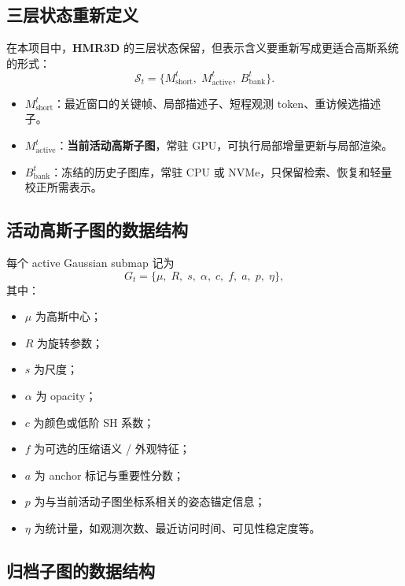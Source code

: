\documentclass[12pt]{article}
\newcommand{\hmr}{\textbf{HMR3D}}
\begin{document}
\subsection{三层状态重新定义}

在本项目中，\hmr{} 的三层状态保留，但表示含义要重新写成更适合高斯系统的形式：
\begin{equation}
\mathcal{S}_t = \{M_{\text{short}}^t,\; M_{\text{active}}^t,\; B_{\text{bank}}^t\}.
\end{equation}

\begin{itemize}
  \item $M_{\text{short}}^t$：最近窗口的关键帧、局部描述子、短程观测 token、重访候选描述子。
  \item $M_{\text{active}}^t$：\textbf{当前活动高斯子图}，常驻 GPU，可执行局部增量更新与局部渲染。
  \item $B_{\text{bank}}^t$：冻结的历史子图库，常驻 CPU 或 NVMe，只保留检索、恢复和轻量校正所需表示。
\end{itemize}

\subsection{活动高斯子图的数据结构}

每个 active Gaussian submap 记为
\begin{equation}
G_t = \{\mu,\; R,\; s,\; \alpha,\; c,\; f,\; a,\; p,\; \eta\},
\end{equation}
其中：
\begin{itemize}
  \item $\mu$ 为高斯中心；
  \item $R$ 为旋转参数；
  \item $s$ 为尺度；
  \item $\alpha$ 为 opacity；
  \item $c$ 为颜色或低阶 SH 系数；
  \item $f$ 为可选的压缩语义 / 外观特征；
  \item $a$ 为 anchor 标记与重要性分数；
  \item $p$ 为与当前活动子图坐标系相关的姿态锚定信息；
  \item $\eta$ 为统计量，如观测次数、最近访问时间、可见性稳定度等。
\end{itemize}

\subsection{归档子图的数据结构}
\end{document}
